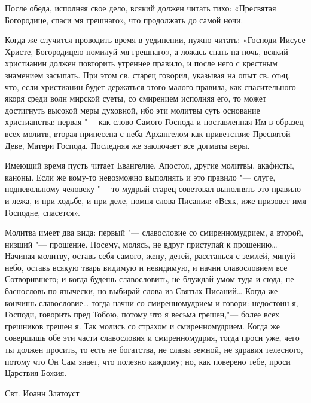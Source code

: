 {После обеда, исполняя свое дело, всякий должен читать тихо: «Пресвятая Богородице, спаси мя грешнаго», что продолжать до самой ночи. 

Когда же случится проводить время в уединении, нужно читать: «Господи Иисусе Христе, Богородицею помилуй мя грешнаго», а ложась спать на ночь, всякий христианин должен повторить утреннее правило, и после него с крестным знамением засыпать. При этом св. старец говорил, указывая на опыт св. отeц, что, если христианин будет держаться этого малого правила, как спасительного якоря среди волн мирской суеты, со смирением исполняя его, то может достигнуть высокой меры духовной, ибо эти молитвы суть  основание христианства: первая "--- как слово Самого Господа и поставленная Им в образец всех молитв, вторая принесена с неба Архангелом как приветствие Пресвятой Деве, Матери Господа. Последняя же заключает все догматы веры. 

Имеющий время пусть читает Евангелие, Апостол, другие молитвы, акафисты, каноны. Если же кому-то невозможно выполнять и это правило "--- слуге, подневольному человеку "--- то мудрый старец советовал выполнять это правило и лежа, и при ходьбе, и при деле, помня слова Писания: «Всяк, иже призовет имя Господне, спасется». 




\mychapterending

 





Молитва имеет два вида: первый "--- славословие со смиренномудрием, а второй, низший "--- прошение. Посему, молясь, не вдруг приступай к прошению… Начиная молитву, оставь себя самого, жену, детей, расстанься с землей, минуй небо, оставь всякую тварь видимую и невидимую, и начни славословием все Сотворившего; и когда будешь славословить, не блуждай умом туда и сюда, не баснословь по-язычески, но выбирай слова из Святых Писаний… Когда же кончишь славословие… тогда начни со смиренномудрием и говори: недостоин я, Господи, говорить пред Тобою, потому что я весьма грешен,"--- более всех грешников грешен я. Так молись со страхом и смиренномудрием. Когда же совершишь обе эти части славословия и смиренномудрия, тогда проси уже, чего ты должен просить, то есть не богатства, не славы земной, не здравия телесного, потому что Он Сам знает, что полезно каждому; но, как поверено тебе, проси Царствия Божия.

\bigskip
Свт. Иоанн Златоуст

}
